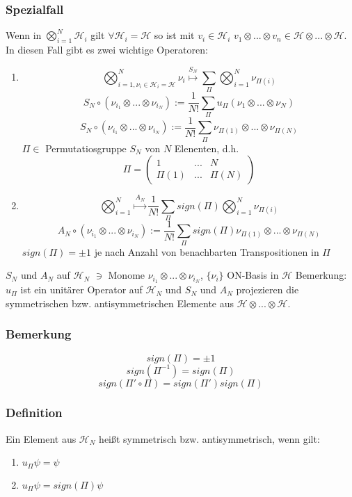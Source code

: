 \documentclass[twoside,a4paper]{scrartcl}
\renewcommand{\1}{\mathds{1}}
\begin{document}
\subsubsection*{Spezialfall}
Wenn in $\bigotimes_{i=1}^N \mathcal H_i$ gilt $\forall \mathcal H_i=\mathcal H $ so ist mit $v_i \in \mathcal H_i$ $v_1\otimes ...\otimes v_n \in \mathcal H \otimes ...\otimes \mathcal H$.\\
In diesen Fall gibt es zwei wichtige Operatoren:
\begin{enumerate}
 \item $$\bigotimes_{i=1,\nu_i\in \mathcal H_i=\mathcal H}^N\nu_i \stackrel{S_N}{\mapsto}\sum_\Pi \bigotimes_{i=1}^N \nu_{\Pi(i)}$$
$$S_N \circ (\nu_{i_1} \otimes ... \otimes \nu_{i_N}):=\frac{1}{N!}\sum_\Pi u_\Pi(\nu_{1} \otimes ... \otimes \nu_{N})$$
$$S_N \circ (\nu_{i_1} \otimes ... \otimes \nu_{i_N}):=\frac{1}{N!}\sum_\Pi \nu_{\Pi(1)} \otimes ... \otimes \nu_{\Pi(N)}$$
$\Pi \in$ Permutatiosgruppe $S_N$ von $N$ Elenenten, d.h. $$\Pi=\begin{pmatrix}1 & ... & N \\ \Pi(1) & ... & \Pi(N)\end{pmatrix}$$ 
\item $$\bigotimes_{i=1}^N \stackrel{A_N}{\mapsto} \frac{1}{N!}\sum_\Pi sign(\Pi) \bigotimes_{i=1}^N \nu_{\Pi(i)}$$
$$A_N \circ (\nu_{i_1} \otimes ... \otimes \nu_{i_N}):=\frac{1}{N!}\sum_\Pi sign(\Pi) \nu_{\Pi(1)} \otimes ... \otimes \nu_{\Pi(N)}$$
$sign(\Pi)=\pm 1$ je nach Anzahl von benachbarten Transpositionen in $\Pi$
\end{enumerate}
$S_N$ und $A_N$ auf $\mathcal H_N$ $\ni$ Monome $\nu_{i_1} \otimes ... \otimes \nu_{i_N}$, $\{\nu_{i}\}$ ON-Basis in $\mathcal H$
Bemerkung: $u_\Pi$ ist ein unitärer Operator auf $\mathcal H_N$ und $S_N$ und $A_N$ projezieren die symmetrischen bzw. antisymmetrischen Elemente aus $\mathcal H \otimes ... \otimes \mathcal H$.
\subsubsection*{Bemerkung}
$$sign(\Pi)=\pm 1$$
$$sign(\Pi^{-1})=sign(\Pi)$$
$$sign(\Pi' \circ \Pi)=sign(\Pi')sign(\Pi)$$

\subsubsection*{Definition}
Ein Element aus $\mathcal H_N$ heißt symmetrisch bzw. antisymmetrisch, wenn gilt:
\begin{enumerate}
 \item $u_\Pi \psi=\psi$
 \item $u_\Pi \psi=sign(\Pi)\psi$
\end{enumerate}
\end{document}
